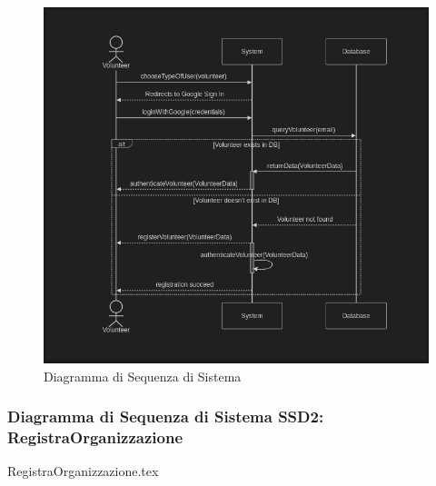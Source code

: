\documentclass[12pt]{article}
\begin{document}
\begin{figure}[H]
    \includegraphics[width=\textwidth, keepaspectratio]{Immagini/SSD/Iterazione 1/SSDRegistraVolontario.png}
        \caption{Diagramma di Sequenza di Sistema}
        \label{fig:diagrammaSSD1}
\end{figure}

\subsubsection{Diagramma di Sequenza di Sistema SSD2: RegistraOrganizzazione}

{RegistraOrganizzazione.tex}
\end{document}
